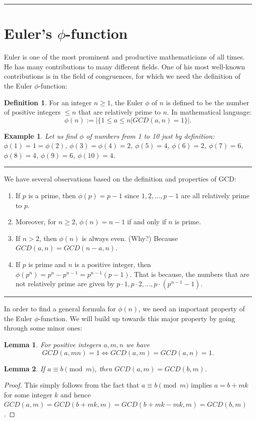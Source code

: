 \documentclass[12pt]{article}
\theoremstyle{plain}
\newtheorem{lemma}{Lemma}
\newtheorem{example}{Example}
\theoremstyle{definition}
\newtheorem{definition}{Definition}
\theoremstyle{remark}
\begin{document}
\bigskip
\hrule

\section{Euler's $\phi$-function}
Euler is one of the most prominent and productive mathematicians of all times. He has many contributions to many different fields. One of his most well-known contributions is in the field of congruences, for which we need the definition of the Euler $\phi$-function:
\begin{definition}
For an integer $n\geq 1$, the Euler $\phi$ of $n$ is defined to be the number of positive integers $\leq n$ that are relatively prime to $n$. In mathematical language:
$$\phi(n):= |\{1\leq a \leq n| GCD(a,n)=1\}|.$$
\end{definition}
\begin{example}
Let us find $\phi$ of numbers from 1 to 10 just by definition:
$\phi(1)=1=\phi(2)$, $\phi(3)=\phi(4)=2$, $\phi(5)=4$, $\phi(6)=2$, $\phi(7)=6$, $\phi(8)=4$, $\phi(9)=6$, $\phi(10)=4$.
\end{example}
\hrule

\bigskip
\noindent
We have several observations based on the definition and properties of GCD:
\begin{enumerate}
    \item If $p$ is a prime, then $\phi(p) = p-1$ since $1,2, \dots, p-1$ are all relatively prime to $p$.
 \item Moreover, for $n\geq 2$, $\phi(n) = n-1$ if and only if $n$ is prime.
 \item If $n>2$, then $\phi(n)$ is always even. (Why?)
 Because $GCD(a,n)=GCD(n-a,n)$.
 \item If $p$ is prime and $n$ is a positive integer, then
 $\phi(p^n)=p^n-p^{n-1} = p^{n-1}(p-1)$. That is because, the numbers that are not relatively prime are given by $p\cdot 1, p\cdot 2, \dots, p\cdot (p^{n-1}-1)$.
\end{enumerate}
\hrule

\bigskip
\noindent
In order to find a general formula for $\phi(n)$, we need an important property of the Euler $\phi$-function. We will build up towards this major property by going through some minor ones:
\begin{lemma}
For positive integers $a, m, n$ we have
$$GCD(a,mn)=1 \Leftrightarrow GCD(a,m)=GCD(a,n)=1.$$
\end{lemma}

\bigskip
\noindent
\begin{lemma}
If $a\equiv b \pmod{m}$, then $GCD(a,m)=GCD(b,m)$.
\end{lemma}
\begin{proof}
This simply follows from the fact that $a\equiv b \pmod{m}$ implies $a=b+mk$ for some integer $k$ and hence
$GCD(a,m) = GCD(b+mk,m) = GCD(b+mk-mk,m) = GCD(b,m)$.
\end{proof}
\end{document}
